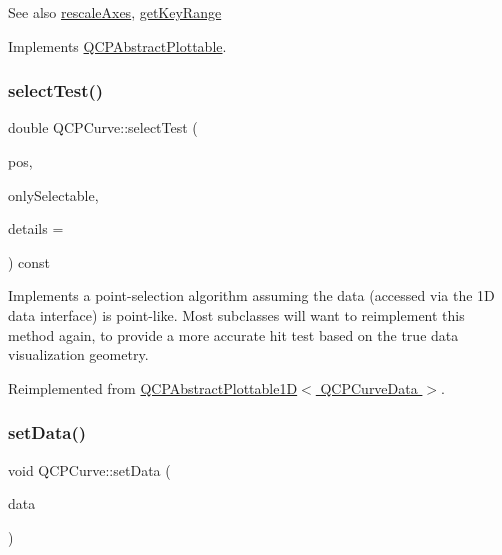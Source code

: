 \begin{DoxySeeAlso}{See also}
\hyperlink{class_q_c_p_abstract_plottable_a1491c4a606bccd2d09e65e11b79eb882}{rescale\+Axes}, \hyperlink{class_q_c_p_curve_a22d09087f78f254731197cc0b8783299}{get\+Key\+Range} 
\end{DoxySeeAlso}


Implements \hyperlink{class_q_c_p_abstract_plottable_a4de773988b21ed090fddd27c6a3a3dcb}{Q\+C\+P\+Abstract\+Plottable}.

\mbox{\label{class_q_c_p_curve_a0ed9b7e6b4bc72010d6fcd974af46a8b}} 
\subsubsection{\texorpdfstring{select\+Test()}{selectTest()}}
{\footnotesize\ttfamily double Q\+C\+P\+Curve\+::select\+Test (\begin{DoxyParamCaption}\item[{const Q\+PointF \&}]{pos,  }\item[{bool}]{only\+Selectable,  }\item[{Q\+Variant $\ast$}]{details = {} }\end{DoxyParamCaption}) const\hspace{0.3cm}{\ttfamily [virtual]}}

Implements a point-\/selection algorithm assuming the data (accessed via the 1D data interface) is point-\/like. Most subclasses will want to reimplement this method again, to provide a more accurate hit test based on the true data visualization geometry.

Reimplemented from \hyperlink{class_q_c_p_abstract_plottable1_d_a071e2df66ba1746067dfcb5e27947b43}{Q\+C\+P\+Abstract\+Plottable1\+D$<$ Q\+C\+P\+Curve\+Data $>$}.

\mbox{\label{class_q_c_p_curve_a41246850d2e080bc57183ca19cd4135e}} 
\subsubsection{\texorpdfstring{set\+Data()}{setData()}\hspace{0.1cm}{\footnotesize\ttfamily [1/3]}}
{\footnotesize\ttfamily void Q\+C\+P\+Curve\+::set\+Data (\begin{DoxyParamCaption}\item[{Q\+Shared\+Pointer$<$ \hyperlink{class_q_c_p_data_container}{Q\+C\+P\+Curve\+Data\+Container} $>$}]{data }\end{DoxyParamCaption})}

